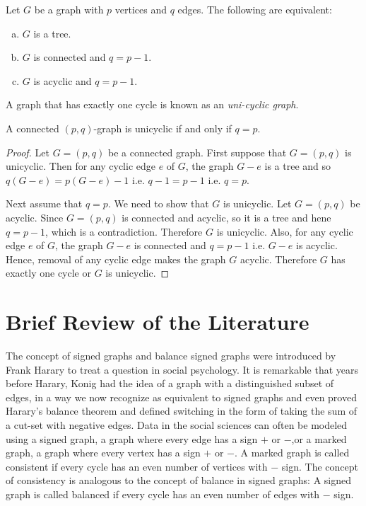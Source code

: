 \begin{theorem}
 Let $G$ be a graph with $p$ vertices and $q$ edges. The following are equivalent:
 \begin{enumerate}[(a).]
  \item $G$ is a tree.
  \item $G$ is connected and $q=p-1$.
  \item $G$ is acyclic and $q=p-1$.
 \end{enumerate}
\end{theorem}
A graph that has exactly one cycle is known as an {\it uni-cyclic graph}. 
\begin{theorem}
 A connected $(p,q)$-graph is unicyclic if and only if $q=p$.
 \end{theorem} 
\begin{proof}
  Let $G=(p,q)$ be a connected graph.
First suppose that $G=(p,q)$ is unicyclic. Then for any cyclic edge $e$ of $G$, the graph $G-e$ is a tree and so 
$q(G-e)=p(G-e)-1$ i.e. $q-1=p-1$ i.e. $q=p.$

Next assume that $q=p$. We need to show that $G$ is unicyclic.
Let $G=(p,q)$ be acyclic. Since $G=(p,q)$ is connected and acyclic, so it is a tree and hene $q=p-1$, which is a 
contradiction. Therefore $G$ is unicyclic. Also, for any cyclic edge $e$ of $G$, the graph $G-e$ is connected and $q=p-1$ i.e. 
$G-e$ 
is acyclic. Hence, removal of any cyclic edge makes the graph $G$ acyclic. Therefore $G$ has exactly one cycle or $G$ is 
unicyclic.
\end{proof}
\section{Brief Review of the Literature}\label{lit}
The concept of  signed graphs and balance signed graphs 
 were introduced by Frank Harary  to treat a question in 
social psychology\cite{HAR53}.
It is 
remarkable that years before Harary, Konig \cite{DEN50} had the idea of a graph with a distinguished subset of edges, in a way we 
now recognize as equivalent to signed graphs and even proved Harary's balance theorem and defined switching in the form of taking 
the sum of a cut-set  with negative edges.
Data in the social sciences can often be modeled using a signed graph, a graph where every edge has a sign $+$ or $-$,or a marked 
graph, a graph where every vertex has a sign $+$ or $-$. A marked graph is called consistent if every cycle has an even number 
of vertices with $-$ sign. The concept of consistency is analogous to the concept of balance in signed graphs: A signed graph is 
called balanced if every cycle has an even number of edges with $-$ sign. 

